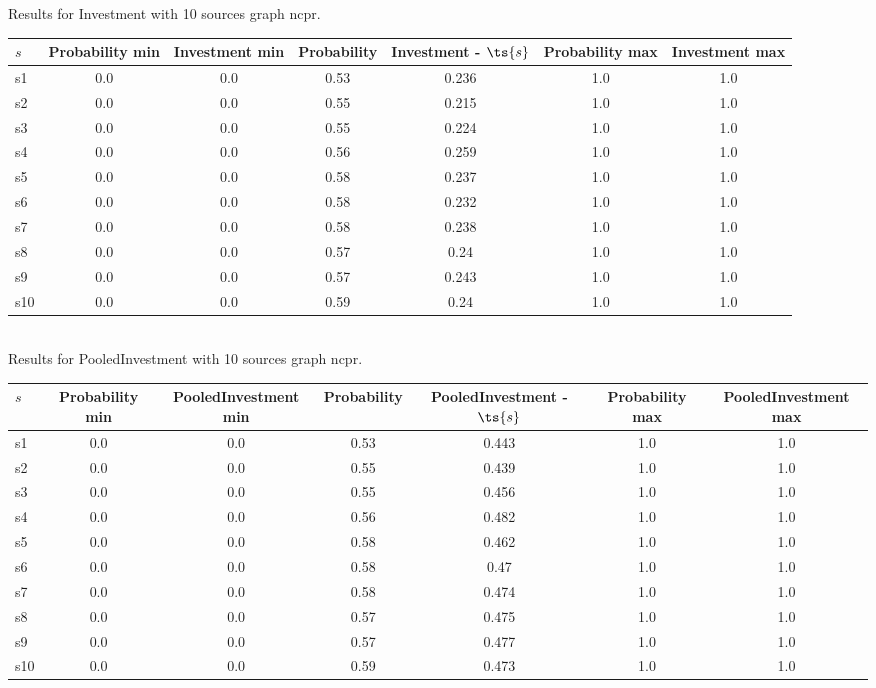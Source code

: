 \documentclass{article}
\begin{document}
\noindent Results for Investment with 10 sources graph ncpr.

\noindent\begin{tabular}{|l|c|c|c|c|c|c|}
\hline
$s$& Probability min & Investment min & Probability & Investment - $\ts{s}$ & Probability max & Investment max\\
\hline
s1 &0.0 & 0.0 & 0.53 & 0.236 & 1.0 & 1.0\\
\hline
s2 &0.0 & 0.0 & 0.55 & 0.215 & 1.0 & 1.0\\
\hline
s3 &0.0 & 0.0 & 0.55 & 0.224 & 1.0 & 1.0\\
\hline
s4 &0.0 & 0.0 & 0.56 & 0.259 & 1.0 & 1.0\\
\hline
s5 &0.0 & 0.0 & 0.58 & 0.237 & 1.0 & 1.0\\
\hline
s6 &0.0 & 0.0 & 0.58 & 0.232 & 1.0 & 1.0\\
\hline
s7 &0.0 & 0.0 & 0.58 & 0.238 & 1.0 & 1.0\\
\hline
s8 &0.0 & 0.0 & 0.57 & 0.24 & 1.0 & 1.0\\
\hline
s9 &0.0 & 0.0 & 0.57 & 0.243 & 1.0 & 1.0\\
\hline
s10 &0.0 & 0.0 & 0.59 & 0.24 & 1.0 & 1.0\\
\hline
\end{tabular}\\

\noindent Results for PooledInvestment with 10 sources graph ncpr.

\noindent\begin{tabular}{|l|c|c|c|c|c|c|}
\hline
$s$& Probability min & PooledInvestment min & Probability & PooledInvestment - $\ts{s}$ & Probability max & PooledInvestment max\\
\hline
s1 &0.0 & 0.0 & 0.53 & 0.443 & 1.0 & 1.0\\
\hline
s2 &0.0 & 0.0 & 0.55 & 0.439 & 1.0 & 1.0\\
\hline
s3 &0.0 & 0.0 & 0.55 & 0.456 & 1.0 & 1.0\\
\hline
s4 &0.0 & 0.0 & 0.56 & 0.482 & 1.0 & 1.0\\
\hline
s5 &0.0 & 0.0 & 0.58 & 0.462 & 1.0 & 1.0\\
\hline
s6 &0.0 & 0.0 & 0.58 & 0.47 & 1.0 & 1.0\\
\hline
s7 &0.0 & 0.0 & 0.58 & 0.474 & 1.0 & 1.0\\
\hline
s8 &0.0 & 0.0 & 0.57 & 0.475 & 1.0 & 1.0\\
\hline
s9 &0.0 & 0.0 & 0.57 & 0.477 & 1.0 & 1.0\\
\hline
s10 &0.0 & 0.0 & 0.59 & 0.473 & 1.0 & 1.0\\
\hline
\end{tabular}\\
\end{document}
